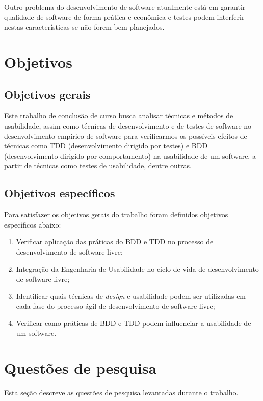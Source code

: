 Outro problema do desenvolvimento de software atualmente está em garantir qualidade de software de forma prática e econômica e testes podem interferir nestas características se não forem bem planejados.


\section{Objetivos}

\subsection{Objetivos gerais}
	 
Este trabalho de conclusão de curso busca analisar técnicas e métodos de usabilidade, assim como técnicas de desenvolvimento e de testes de software no desenvolvimento empírico de software para verificarmos os possíveis efeitos de técnicas como TDD (desenvolvimento dirigido por testes) e BDD (desenvolvimento dirigido por comportamento) na usabilidade de um software, a partir de técnicas como testes de usabilidade, dentre outras.
	 
	 
\subsection{Objetivos específicos}

Para satisfazer os objetivos gerais do trabalho foram definidos objetivos específicos abaixo:

\begin{enumerate}
\item Verificar aplicação das práticas do BDD e TDD no processo de desenvolvimento de software livre;

\item Integração da Engenharia de Usabilidade no ciclo de vida de desenvolvimento de software livre;
\item Identificar quais técnicas de \emph{design} e usabilidade  podem ser utilizadas em cada fase do processo ágil de desenvolvimento de software livre;
\item Verificar como práticas de BDD e TDD podem influenciar a usabilidade de um software.


\end{enumerate}

\section{Questões de pesquisa}
Esta seção descreve as questões de pesquisa levantadas durante o trabalho.

